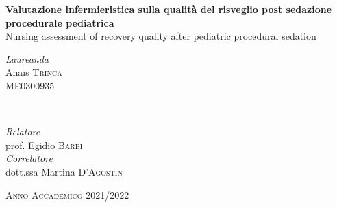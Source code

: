 \begin{titlepage}
\begin{center}
	
	\vfill
	
	{\huge\bfseries Valutazione infermieristica sulla qualità del risveglio post sedazione procedurale pediatrica}\\ [0.2cm] %
	
	{\huge Nursing assessment of recovery quality after pediatric procedural sedation}\\ [0.2cm] %
	
	\vfill\vfill
	
	
	\begin{minipage}{0.4\textwidth}
		\begin{flushleft}
			\large
			\textit{Laureanda}\\
			Ana\"is \textsc{Trinca}\\ %
			\small{ME0300935}
		\end{flushleft}
	\end{minipage}
	~
	\begin{minipage}{0.4\textwidth}
		\begin{flushright}
			\large
			\textit{Relatore}\\
			prof. Egidio \textsc{Barbi} \\ %
			\bigskip
			\textit{Correlatore}\\ 
			dott.ssa Martina \textsc{D'Agostin} \\ %
		\end{flushright}
	\end{minipage}
	
	
	\vfill\vfill\vfill
	
	{\large \textsc{Anno Accademico 2021/2022}}
	
	\vfill
	\end{center}
\end{titlepage}

